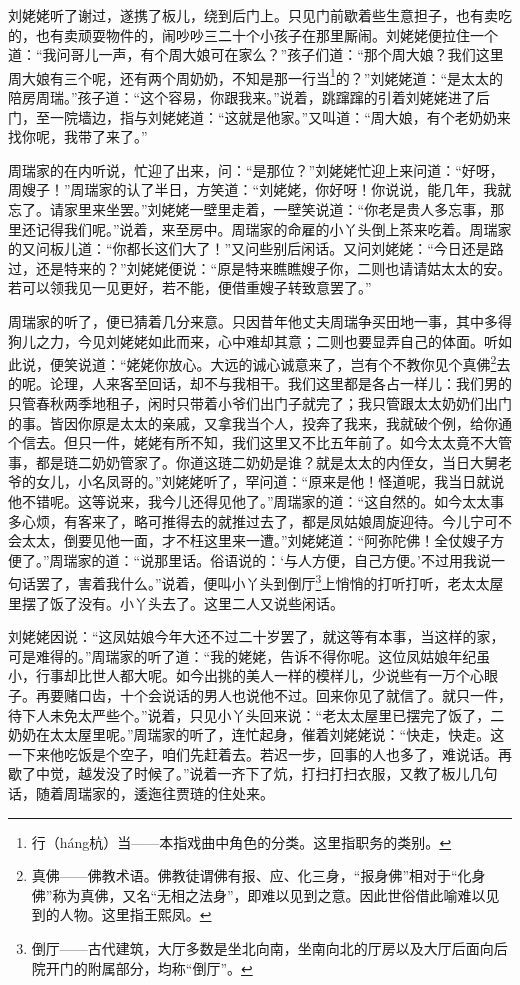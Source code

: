 \par 刘姥姥听了谢过，遂携了板儿，绕到后门上。只见门前歇着些生意担子，也有卖吃的，也有卖顽耍物件的，闹吵吵三二十个小孩子在那里厮闹。刘姥姥便拉住一个道：“我问哥儿一声，有个周大娘可在家么？”孩子们道：“那个周大娘？我们这里周大娘有三个呢，还有两个周奶奶，不知是那一行当\footnote{行（háng杭）当——本指戏曲中角色的分类。这里指职务的类别。}的？”刘姥姥道：“是太太的陪房周瑞。”孩子道：“这个容易，你跟我来。”说着，跳蹿蹿的引着刘姥姥进了后门，至一院墙边，指与刘姥姥道：“这就是他家。”又叫道：“周大娘，有个老奶奶来找你呢，我带了来了。”
\par 周瑞家的在内听说，忙迎了出来，问：“是那位？”刘姥姥忙迎上来问道：“好呀，周嫂子！”周瑞家的认了半日，方笑道：“刘姥姥，你好呀！你说说，能几年，我就忘了。请家里来坐罢。”刘姥姥一壁里走着，一壁笑说道：“你老是贵人多忘事，那里还记得我们呢。”说着，来至房中。周瑞家的命雇的小丫头倒上茶来吃着。周瑞家的又问板儿道：“你都长这们大了！”又问些别后闲话。又问刘姥姥：“今日还是路过，还是特来的？”刘姥姥便说：“原是特来瞧瞧嫂子你，二则也请请姑太太的安。若可以领我见一见更好，若不能，便借重嫂子转致意罢了。”
\par 周瑞家的听了，便已猜着几分来意。只因昔年他丈夫周瑞争买田地一事，其中多得狗儿之力，今见刘姥姥如此而来，心中难却其意；二则也要显弄自己的体面。听如此说，便笑说道：“姥姥你放心。大远的诚心诚意来了，岂有个不教你见个真佛\footnote{真佛——佛教术语。佛教徒谓佛有报、应、化三身，“报身佛”相对于“化身佛”称为真佛，又名“无相之法身”，即难以见到之意。因此世俗借此喻难以见到的人物。这里指王熙凤。}去的呢。论理，人来客至回话，却不与我相干。我们这里都是各占一样儿：我们男的只管春秋两季地租子，闲时只带着小爷们出门子就完了；我只管跟太太奶奶们出门的事。皆因你原是太太的亲戚，又拿我当个人，投奔了我来，我就破个例，给你通个信去。但只一件，姥姥有所不知，我们这里又不比五年前了。如今太太竟不大管事，都是琏二奶奶管家了。你道这琏二奶奶是谁？就是太太的内侄女，当日大舅老爷的女儿，小名凤哥的。”刘姥姥听了，罕问道：“原来是他！怪道呢，我当日就说他不错呢。这等说来，我今儿还得见他了。”周瑞家的道：“这自然的。如今太太事多心烦，有客来了，略可推得去的就推过去了，都是凤姑娘周旋迎待。今儿宁可不会太太，倒要见他一面，才不枉这里来一遭。”刘姥姥道：“阿弥陀佛！全仗嫂子方便了。”周瑞家的道：“说那里话。俗语说的：‘与人方便，自己方便。’不过用我说一句话罢了，害着我什么。”说着，便叫小丫头到倒厅\footnote{倒厅——古代建筑，大厅多数是坐北向南，坐南向北的厅房以及大厅后面向后院开门的附属部分，均称“倒厅”。}上悄悄的打听打听，老太太屋里摆了饭了没有。小丫头去了。这里二人又说些闲话。
\par 刘姥姥因说：“这凤姑娘今年大还不过二十岁罢了，就这等有本事，当这样的家，可是难得的。”周瑞家的听了道：“我的姥姥，告诉不得你呢。这位凤姑娘年纪虽小，行事却比世人都大呢。如今出挑的美人一样的模样儿，少说些有一万个心眼子。再要赌口齿，十个会说话的男人也说他不过。回来你见了就信了。就只一件，待下人未免太严些个。”说着，只见小丫头回来说：“老太太屋里已摆完了饭了，二奶奶在太太屋里呢。”周瑞家的听了，连忙起身，催着刘姥姥说：“快走，快走。这一下来他吃饭是个空子，咱们先赶着去。若迟一步，回事的人也多了，难说话。再歇了中觉，越发没了时候了。”说着一齐下了炕，打扫打扫衣服，又教了板儿几句话，随着周瑞家的，逶迤往贾琏的住处来。
